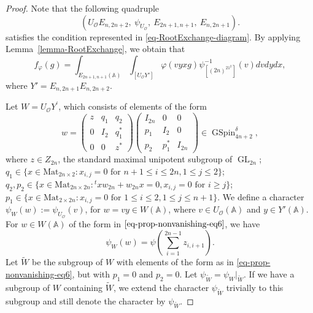 \documentclass[12pt]{amsart}
\newcommand{\A}{\mathbb{A}}
\newcommand{\wt}{\widetilde}
\theoremstyle{remark}
\DeclareMathOperator{\GL}{GL}
\DeclareMathOperator{\GSpin}{GSpin}
\begin{document}
\begin{proof}
Note that the following quadruple
\begin{equation*}
(U_{\mathcal{O}} {E_{n,2n+2}},\   \psi_{U_{\mathcal{O}}}, \ E_{2n+1,n+1}, \ E_{n,2n+1}).
\end{equation*}
satisfies the condition represented in \eqref{eq-RootExchange-diagram}. By applying Lemma~\ref{lemma-RootExchange}, we obtain that 
\begin{equation}
\label{eq-prop-nonvanishing-eq5}
f_\varphi(g)=\int_{E_{2n+1,n+1}(\A)}\int_{[U_{\mathcal{O}} Y']}
\varphi(vyxg) \psi^{-1}_{[(2n)^21^2]}(v) dvdydx,
\end{equation}
where $Y' = E_{n,2n+1} E_{n,2n+2}$.


Let $W=U_{\mathcal{O}}Y^\prime$, which consists of elements of the form
\begin{equation}
\label{eq-prop-nonvanishing-eq6}
w=\begin{pmatrix}
z & q_1 & q_2\\
0 & I_2 & q_1^*\\
0 & 0 & z^*
\end{pmatrix}\begin{pmatrix}
I_{2n} & 0 & 0\\
p_1& I_2 & 0\\
p_2 &p_1^*& I_{2n}
\end{pmatrix} \in \GSpin^{\delta}_{4n+2},
\end{equation}
where $z \in Z_{2n}$, the standard maximal unipotent subgroup of $\GL_{2n}$; $q_1 \in \{x\in \mathrm{Mat}_{2n \times 2}: x_{i,j}=0 \text{ for } n+1 \leq i \leq 2n, 1 \leq j \leq 2 \}$;
$q_2, p_2\in \{x\in \mathrm{Mat}_{2n\times 2n}: {}^t x w_{2n}+w_{2n}x=0, x_{i,j}=0 \text{ for }i\ge j \}$;
$p_1 \in \{ x\in \mathrm{Mat}_{2 \times 2n}: x_{i,j}=0 \text{ for }1 \leq i \leq 2, 1 \leq j \leq n+1 \}$.
We define a character $\psi_W(w):= \psi_{U_{\mathcal{O}}}(v)$,
for $w=vy \in W(\A)$, where $v \in U_{\mathcal{O}}(\A)$ and $y \in Y'(\A)$. 
For $w\in W(\A)$ of the form in $\eqref{eq-prop-nonvanishing-eq6}$, we have
\begin{equation*}
	\psi_W(w)=\psi(\sum_{i=1}^{2n-1} z_{i,i+1}).
\end{equation*}
Let $\wt{W}$ be the subgroup of $W$ with elements of the form as in \eqref{eq-prop-nonvanishing-eq6}, but with $p_1=0$ and $p_2=0$. Let $\psi_{\wt{W}} = \psi_W|_{\wt{W}}$. 
If we have a subgroup of $W$ containing $\wt{W}$, we extend the character $\psi_{\wt{W}}$ trivially to this subgroup and still denote the character by $\psi_{\wt{W}}$.


\end{proof}
\end{document}
